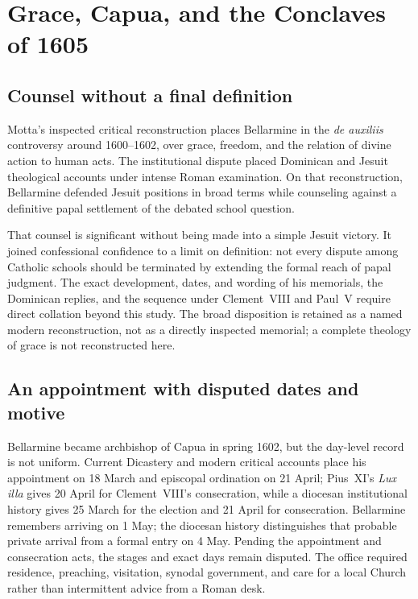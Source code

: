 \section{Grace, Capua, and the Conclaves of 1605}

\subsection{Counsel without a final definition}

Motta's inspected critical reconstruction places Bellarmine in the
\emph{de auxiliis} controversy around 1600--1602, over grace, freedom, and the
relation of divine action to human acts.  The institutional dispute placed
Dominican and Jesuit theological accounts under intense Roman examination.
On that reconstruction, Bellarmine defended Jesuit positions in broad terms
while counseling against a definitive papal settlement of the debated school
question.

That counsel is significant without being made into a simple Jesuit victory.
It joined confessional confidence to a limit on definition: not every dispute
among Catholic schools should be terminated by extending the formal reach of
papal judgment.  The exact development, dates, and wording of his memorials,
the Dominican replies, and the sequence under Clement~VIII and Paul~V require
direct collation beyond this study.  The broad disposition is retained as a
named modern reconstruction, not as a directly inspected memorial; a complete
theology of grace is not reconstructed here.

\subsection{An appointment with disputed dates and motive}

Bellarmine became archbishop of Capua in spring 1602, but the day-level record
is not uniform.  Current Dicastery and modern critical accounts place his
appointment on 18 March and episcopal ordination on 21 April; Pius~XI's
\emph{Lux illa} gives 20 April for Clement~VIII's consecration, while a
diocesan institutional history gives 25 March for the election and 21 April
for consecration.  Bellarmine remembers arriving on 1 May; the diocesan history
distinguishes that probable private arrival from a formal entry on 4 May.
Pending the appointment and consecration acts, the stages and exact days remain
disputed.  The office required residence, preaching, visitation, synodal
government, and care for a local Church rather than intermittent advice from a
Roman desk.

